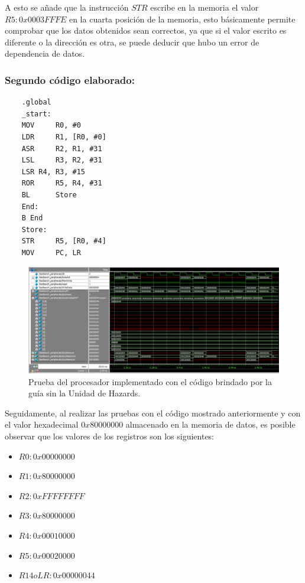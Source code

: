 A esto se añade que la instrucción $STR$ escribe en la memoria el valor $R5:0x0003FFFE$ en la cuarta posición de la memoria, esto básicamente permite comprobar que los datos obtenidos sean correctos, ya que si el valor escrito es diferente o la dirección es otra, se puede deducir que hubo un error de dependencia de datos.
\subsubsection*{Segundo código elaborado:}
\begin{lstlisting}
	.global
	_start:
	MOV 	R0, #0
	LDR 	R1, [R0, #0]
	ASR 	R2, R1, #31
	LSL 	R3, R2, #31
	LSR	R4, R3, #15
	ROR 	R5, R4, #31
	BL		Store
	End:
	B End
	Store:
	STR		R5, [R0, #4]
	MOV		PC, LR
\end{lstlisting}

\begin{figure}[H]
	\centering
	\includegraphics[width = \linewidth]{images/SimulacionGuiaSinHazards.PNG}
	\caption{Prueba del procesador implementado con el código brindado por la guía sin la Unidad de Hazards.}
	\label{fig:Código guiá sin unidad de Hazards}
\end{figure}

Seguidamente, al realizar las pruebas con el código mostrado anteriormente y con el valor hexadecimal $0x80000000$ almacenado en la memoria de datos, es posible observar que los valores de los registros son los siguientes:
\begin{itemize}
	\item $R0:0x00000000$
	\item $R1:0x80000000$
	\item $R2:0xFFFFFFFF$
	\item $R3:0x80000000$
	\item $R4:0x00010000$
	\item $R5:0x00020000$
	\item $R14 o LR:0x00000044$
\end{itemize}

